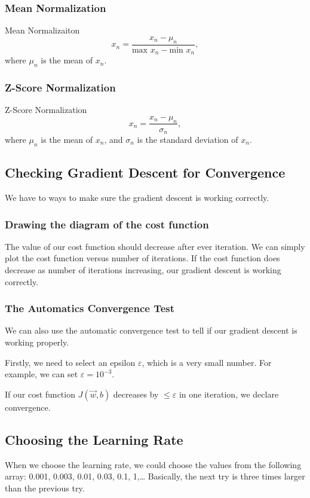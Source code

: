 \documentclass[12pt,a4paper]{article}
\begin{document}
\subsubsection{Mean Normalization}
\begin{thmbox}{Mean Normalizaiton}
	$$x_n=\frac{x_n-\mu_n}{\text{max }x_n-\text{min }x_n},$$
	where $\mu_n$ is the mean of $x_n$.
\end{thmbox}
\subsubsection{Z-Score Normalization}
\begin{thmbox}{Z-Score Normalization}
	$$x_n=\frac{x_n-\mu_n}{\sigma_n},$$
	where $\mu_n$ is the mean of $x_n$, and $\sigma_n$ is the standard deviation of $x_n$.
\end{thmbox}

\subsection{Checking Gradient Descent for Convergence}
\quad We have to ways to make sure the gradient descent is working correctly. 
\subsubsection{Drawing the diagram of the cost function}
\quad The value of our cost function should decrease after ever iteration. We can simply plot the cost function versus number of iterations. If the cost function does decrease as number of iterations increasing, our gradient descent is working correctly. 
\subsubsection{The Automatics Convergence Test}
\quad We can also use the automatic convergence test to tell if our gradient descent is working properly. 

Firstly, we need to select an epsilon $\varepsilon$, which is a very small number. For example, we can set $\varepsilon=10^{-3}$.

If our cost function $J(\vec{w},b)$ decreases by  $\leq\varepsilon$ in one iteration, we declare convergence. 

\subsection{Choosing the Learning Rate}
\quad When we choose the learning rate, we could choose the values from the following array: 0.001, 0.003, 0.01, 0.03, 0.1, 1,… Basically, the next try is three times larger than the previous try. 
\end{document}

